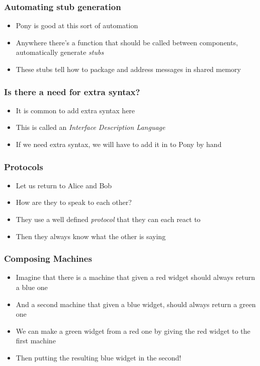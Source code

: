 \documentclass[bigger]{beamer}
\begin{document}
\begin{frame}
\frametitle{Automating stub generation}
\label{sec-5}

\begin{itemize}
\item Pony is good at this sort of automation
\item Anywhere there's a function that should be called between components, automatically generate \emph{stubs}
\item These stubs tell how to package and address messages in shared memory
\end{itemize}
\end{frame}
\begin{frame}
\frametitle{Is there a need for extra syntax?}
\label{sec-6}

\begin{itemize}
\item It is common to add extra syntax here
\item This is called an \emph{Interface Description Language}
\item If we need extra syntax, we will have to add it in to Pony by hand
\end{itemize}
\end{frame}
\begin{frame}
\frametitle{Protocols}
\label{sec-7}

\begin{itemize}
\item Let us return to Alice and Bob
\item How are they to speak to each other?
\item They use a well defined \emph{protocol} that they can each react to
\item Then they always know what the other is saying
\end{itemize}
\end{frame}
\begin{frame}
\frametitle{Composing Machines}
\label{sec-8}

\begin{itemize}
\item Imagine that there is a machine that given a red widget should always return a blue one
\item And a second machine that given a blue widget, should always return a green one
\item We can make a green widget from a red one by giving the red widget to the first machine
\item Then putting the resulting blue widget in the second!
\end{itemize}
\end{frame}
\end{document}
